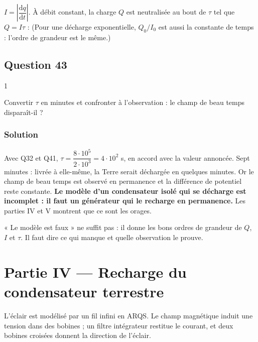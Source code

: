 \documentclass[11pt,a4paper]{article}
\newcommand{\equationajustee}[1]{%
  \sbox{\boiteequation}{$\displaystyle #1$}%
  \ifdim\wd\boiteequation>\linewidth
    \[\resizebox{\linewidth}{!}{\usebox{\boiteequation}}\]%
  \else
    \[#1\]%
  \fi}
\begin{document}
\(I=\left|\dfrac{\mathrm dq}{\mathrm dt}\right|\). À débit constant, la charge \(Q\) est neutralisée au bout de \(\tau\) tel que \(Q=I\tau\) :
\equationajustee{\boxed{\tau=\frac QI}}
(Pour une décharge exponentielle, \(Q_0/I_0\) est aussi la constante de temps : l'ordre de grandeur est le même.)

\hypertarget{question-43}{%
\subsection{Question 43}\label{question-43}}

\begin{indication}{1}

Convertir \(\tau\) en minutes et confronter à l'observation : le champ de beau temps disparaît-il ?

\end{indication}

\hypertarget{solution-42}{%
\subsubsection{Solution}\label{solution-42}}

Avec Q32 et Q41, \(\tau=\dfrac{8\cdot10^5}{2\cdot10^3}=4\cdot10^2\) s, en accord avec la valeur annoncée. Sept minutes : livrée à elle-même, la Terre serait déchargée en quelques minutes. Or le champ de beau temps est observé en permanence et la différence de potentiel reste constante. \textbf{Le modèle d'un condensateur isolé qui se décharge est incomplet : il faut un générateur qui le recharge en permanence.} Les parties IV et V montrent que ce sont les orages.

\begin{piege}

« Le modèle est faux » ne suffit pas : il donne les bons ordres de grandeur de \(Q\), \(I\) et \(\tau\). Il faut dire ce qui manque et quelle observation le prouve.

\end{piege}

\hypertarget{partie-iv-recharge-du-condensateur-terrestre}{%
\section{Partie IV --- Recharge du condensateur terrestre}\label{partie-iv-recharge-du-condensateur-terrestre}}

L'éclair est modélisé par un fil infini en ARQS. Le champ magnétique induit une tension dans des bobines ; un filtre intégrateur restitue le courant, et deux bobines croisées donnent la direction de l'éclair.
\end{document}
